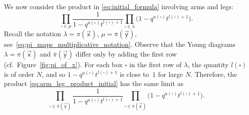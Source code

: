 We now consider the product
in \eqref{eq:initial_formula}
involving arms and legs:
\begin{equation}
	\label{eq:arm_leg_product_initial}
	\prod_{\square\in \mu}
	\frac{1}
	{1-q^{a(\square)}t^{l(\square)+1}}
	\prod_{\square\in \lambda}
	\bigl(1-q^{a(\square)}t^{l(\square)+1}\bigr).
\end{equation}
Recall the notation
$\lambda=\pi(\vec{\mathsf{x}})$,
$\mu=\overline\pi(\vec{\mathsf{y}})$, see~\eqref{eq:pi_maps_multiplicative_notation}.
Observe that the Young diagrams
$\lambda=\pi(\vec{\mathsf{x}})$ and
$\overline\pi(\vec{\mathsf{y}})$ differ only by
adding the first row (cf.\ Figure~\ref{fig:pi_of_x}).
For each box $\square$ in the first row of $\lambda$, the quantity
$l(\square)$ is of order $N$, and so
$1-q^{a(\square)}t^{l(\square)+1}$ is close to~$1$
for large $N$.
Therefore, the product
\eqref{eq:arm_leg_product_initial}
has the same limit as
\begin{equation}	\label{eq:arm_leg_product_proof_1}
	\prod_{\square\in \overline\pi(\vec{\mathsf{y}})}
	\frac{1}
	{1-q^{a(\square)}t^{l(\square)+1}}
	\prod_{\square\in \overline\pi(\vec{\mathsf{x}})}
	\bigl(1-q^{a(\square)}t^{l(\square)+1}\bigr).
\end{equation}

